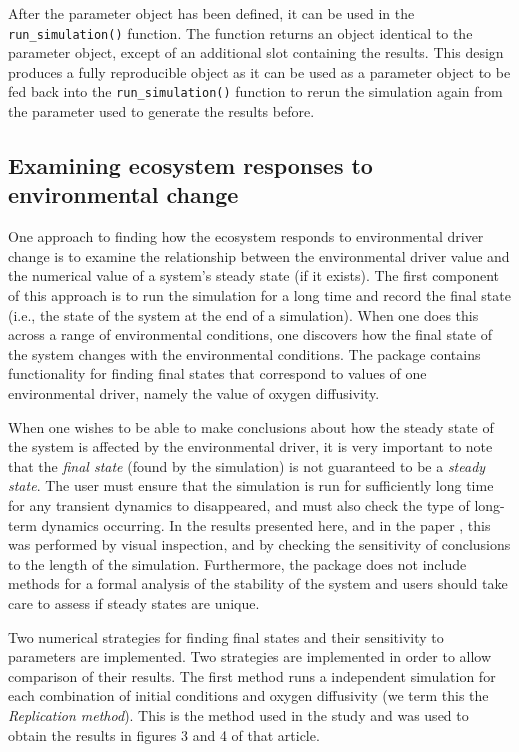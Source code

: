 \documentclass[]{elsarticle} %
\begin{document}
After the parameter object has been defined, it can be used in the \texttt{run\_simulation()} function. The function returns an object identical to the parameter object, except of an additional slot containing the results. This design produces a fully reproducible object as it can be used as a parameter object to be fed back into the \texttt{run\_simulation()} function to rerun the simulation again from the parameter used to generate the results before.

\hypertarget{examining-ecosystem-responses-to-environmental-change}{%
\subsection{Examining ecosystem responses to environmental change}\label{examining-ecosystem-responses-to-environmental-change}}

One approach to finding how the ecosystem responds to environmental driver change is to examine the relationship between the environmental driver value and the numerical value of a system's steady state (if it exists). The first component of this approach is to run the simulation for a long time and record the final state (i.e., the state of the system at the end of a simulation). When one does this across a range of environmental conditions, one discovers how the final state of the system changes with the environmental conditions. The package contains functionality for finding final states that correspond to values of one environmental driver, namely the value of oxygen diffusivity.

When one wishes to be able to make conclusions about how the steady state of the system is affected by the environmental driver, it is very important to note that the \emph{final state} (found by the simulation) is not guaranteed to be a \emph{steady state}. The user must ensure that the simulation is run for sufficiently long time for any transient dynamics to disappeared, and must also check the type of long-term dynamics occurring. In the results presented here, and in the paper \citet{Limberger2023}, this was performed by visual inspection, and by checking the sensitivity of conclusions to the length of the simulation. Furthermore, the package does not include methods for a formal analysis of the stability of the system and users should take care to assess if steady states are unique.

Two numerical strategies for finding final states and their sensitivity to parameters are implemented. Two strategies are implemented in order to allow comparison of their results. The first method runs a independent simulation for each combination of initial conditions and oxygen diffusivity (we term this the \emph{Replication method}). This is the method used in the \citet{Bush2017} study and was used to obtain the results in figures 3 and 4 of that article.
\end{document}
